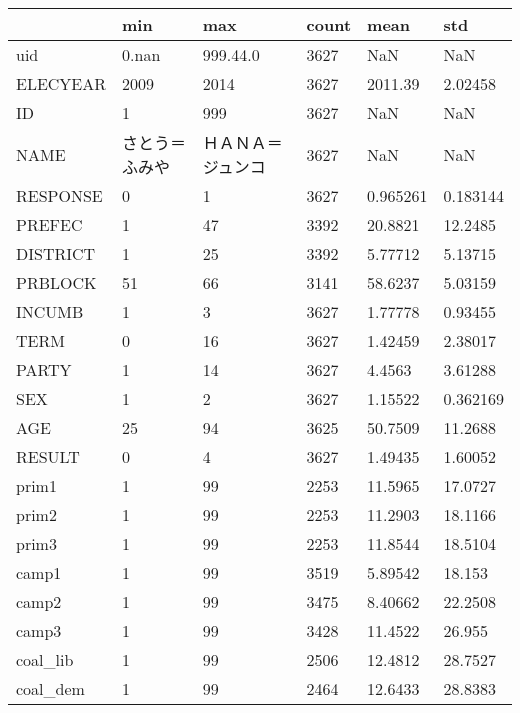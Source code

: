 \begin{tabular}{llllll}
\toprule
{} &      min &        max & count &      mean &       std \\
\midrule
uid           &    0.nan &   999.44.0 &  3627 &       NaN &       NaN \\
ELECYEAR      &     2009 &       2014 &  3627 &   2011.39 &   2.02458 \\
ID            &        1 &        999 &  3627 &       NaN &       NaN \\
NAME          &  さとう＝ふみや &  ＨＡＮＡ＝ジュンコ &  3627 &       NaN &       NaN \\
RESPONSE      &        0 &          1 &  3627 &  0.965261 &  0.183144 \\
PREFEC        &        1 &         47 &  3392 &   20.8821 &   12.2485 \\
DISTRICT      &        1 &         25 &  3392 &   5.77712 &   5.13715 \\
PRBLOCK       &       51 &         66 &  3141 &   58.6237 &   5.03159 \\
INCUMB        &        1 &          3 &  3627 &   1.77778 &   0.93455 \\
TERM          &        0 &         16 &  3627 &   1.42459 &   2.38017 \\
PARTY         &        1 &         14 &  3627 &    4.4563 &   3.61288 \\
SEX           &        1 &          2 &  3627 &   1.15522 &  0.362169 \\
AGE           &       25 &         94 &  3625 &   50.7509 &   11.2688 \\
RESULT        &        0 &          4 &  3627 &   1.49435 &   1.60052 \\
prim1         &        1 &         99 &  2253 &   11.5965 &   17.0727 \\
prim2         &        1 &         99 &  2253 &   11.2903 &   18.1166 \\
prim3         &        1 &         99 &  2253 &   11.8544 &   18.5104 \\
camp1         &        1 &         99 &  3519 &   5.89542 &    18.153 \\
camp2         &        1 &         99 &  3475 &   8.40662 &   22.2508 \\
camp3         &        1 &         99 &  3428 &   11.4522 &    26.955 \\
coal\_lib      &        1 &         99 &  2506 &   12.4812 &   28.7527 \\
coal\_dem      &        1 &         99 &  2464 &   12.6433 &   28.8383 \\

\end{tabular}
